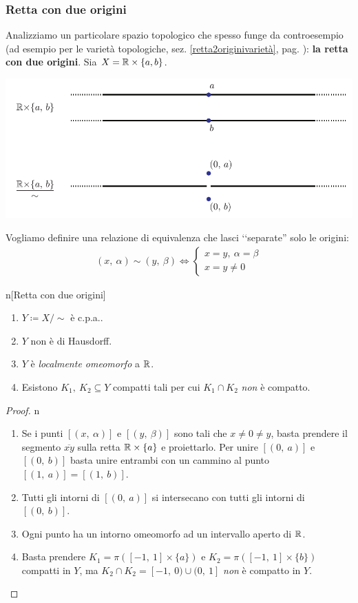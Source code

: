 \subsubsection{Retta con due origini} \label{retta 2 origini}
Analizziamo un particolare spazio topologico che spesso funge da controesempio (ad esempio per le varietà topologiche, sez. \ref{retta2originivarietà}, pag. \pageref{retta2originivarietà}): \textbf{la retta con due origini}. Sia $X=\mathbb{R}\times\{a,b\}$.
\begin{center}
	\includegraphics[trim=0cm 0cm 0cm 0cm,clip,scale=0.95]{images/line2origins.pdf}
\end{center}
Vogliamo definire una relazione di equivalenza che lasci ‘‘separate'' solo le origini:
	\begin{gather*}
		(x, \ \alpha)\sim (y, \ \beta) \iff
			\begin{cases}
				x=y,\ \alpha=\beta \\
				x=y\neq 0
			\end{cases}		
	\end{gather*}
\begin{property}{n}[Retta con due origini]
	\begin{enumerate}
		\item $Y\coloneqq X/\!\sim$ è c.p.a..
		\item $Y$ non è di Hausdorff.
		\item $Y$ è \textit{localmente omeomorfo} a $\mathbb{R}$.
		\item Esistono $K_1, \ K_2\subseteq Y$ compatti tali per cui $K_1\cap K_2$ \textit{non} è compatto.
	\end{enumerate}
\end{property}
\begin{proof}{n}~{}
		\begin{enumerate}[label=\Roman*]
		\item Se i punti $[(x, \ \alpha)]$ e $[(y, \ \beta)]$ sono tali che $x\neq 0 \neq y$, basta prendere il segmento $\overline{xy}$ sulla retta $\mathbb{R}\times\{a\}$ e proiettarlo. Per unire $[(0,\ a)]$ e $[(0, \ b)]$ basta unire entrambi con un cammino al punto $[(1, \ a)]=[(1, \ b)]$.
		\item Tutti gli intorni di $[(0, \ a)]$ si intersecano con tutti gli intorni di $[(0, \ b)]$.
		\item Ogni punto ha un intorno omeomorfo ad un intervallo aperto di $\mathbb{R}$.
		\item Basta prendere $K_1=\pi\left([-1, \ 1]\times \{a\} \right)$ e $K_2=\pi\left([-1, \ 1]\times \{b\} \right)$ compatti in $Y$, ma $K_2\cap K_2= [-1,\ 0) \cup (0,\ 1]$ \textit{non} è compatto in $Y$.\qedhere
	\end{enumerate}
\end{proof}
